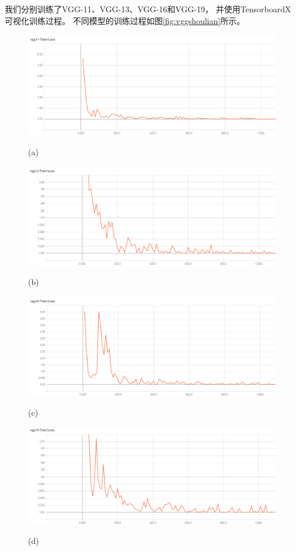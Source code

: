 我们分别训练了VGG-11、VGG-13、VGG-16和VGG-19，
并使用TensorboardX可视化训练过程。
不同模型的训练过程如图\ref{fig:vggshoulian}所示。
\begin{figure}[htbp]
\centering
\begin{minipage}{0.8\linewidth}
\centerline{\includegraphics[width=1.0\linewidth]{figures/vgg11.png}}
\centerline{(a)}
\end{minipage}

\begin{minipage}{0.8\linewidth}
\centerline{\includegraphics[width=1.0\linewidth]{figures/vgg13.png}}
\centerline{(b)}
\end{minipage}

\begin{minipage}{0.8\linewidth}
\centerline{\includegraphics[width=1.0\linewidth]{figures/vgg16.png}}
\centerline{(c)}
\end{minipage}

\begin{minipage}{0.8\linewidth}
\centerline{\includegraphics[width=1.0\linewidth]{figures/vgg19.png}}
\centerline{(d)}
\end{minipage}


\end{figure}
